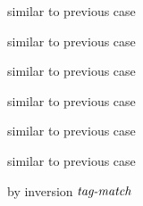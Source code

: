 {\begin{lamportproof*}
    \begin{pfproof}
      similar to previous case
    \end{pfproof}

    \begin{pfproof}
      similar to previous case
    \end{pfproof}

    \begin{pfproof}
      similar to previous case
    \end{pfproof}

    \begin{pfproof}
      similar to previous case
    \end{pfproof}

    \begin{pfproof}
      similar to previous case
    \end{pfproof}

    \begin{pfproof}
      similar to previous case
    \end{pfproof}

    \begin{pfproof}
        \begin{pfproof}
          by inversion $\textit{tag-match}$
        \end{pfproof}
      \qedstep
    \end{pfproof}


\end{lamportproof*}}
